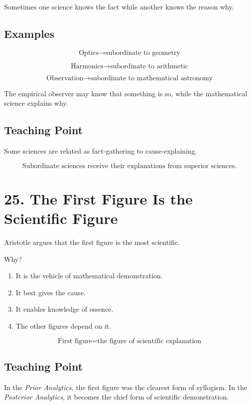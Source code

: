 \documentclass[12pt]{article}
\begin{document}
Sometimes one science knows the fact while another knows the reason why.

\subsection*{Examples}

\[
\text{Optics} \rightarrow \text{subordinate to geometry}
\]

\[
\text{Harmonics} \rightarrow \text{subordinate to arithmetic}
\]

\[
\text{Observation} \rightarrow \text{subordinate to mathematical astronomy}
\]

The empirical observer may know that something is so, while the mathematical
science explains why.

\subsection*{Teaching Point}

Some sciences are related as fact-gathering to cause-explaining.

\[
\boxed{
\text{Subordinate sciences receive their explanations from superior sciences.}
}
\]

\section*{25. The First Figure Is the Scientific Figure}

Aristotle argues that the first figure is the most scientific.

Why?

\begin{enumerate}[itemsep=0.25em]
    \item It is the vehicle of mathematical demonstration.
    \item It best gives the cause.
    \item It enables knowledge of essence.
    \item The other figures depend on it.
\end{enumerate}

\[
\boxed{
\text{First figure} = \text{the figure of scientific explanation}
}
\]

\subsection*{Teaching Point}

In the \textit{Prior Analytics}, the first figure was the clearest form of
syllogism. In the \textit{Posterior Analytics}, it becomes the chief form of
scientific demonstration.
\end{document}
